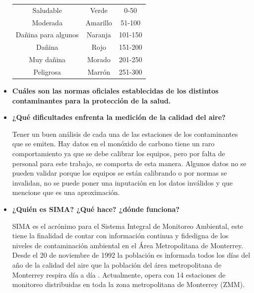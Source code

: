 \documentclass[10pt]{article}
\begin{document}
\begin{itemize}
            \begin{tabular}{c|c|c}
                 Saludable & Verde & 0-50  \\
                 Moderada & Amarillo & 51-100\\
                 Dañina para algunos & Naranja & 101-150\\
                 Dañina & Rojo & 151-200\\
                 Muy dañina & Morado & 201-250\\
                 Peligrosa & Marrón & 251-300
            \end{tabular}

        \item \textbf{Cuáles son las normas oficiales establecidas de los distintos contaminantes para la protección de la salud.}

        \item \textbf{¿Qué dificultades enfrenta la medición de la calidad del aire?}

        Tener un  buen análisis de cada una de las estaciones de los contaminantes que se emiten.
        Hay datos en el monóxido de carbono tiene un raro comportamiento ya que se debe calibrar los equipos, pero por falta de personal para este trabajo, se comporta de esta manera.
        Algunos datos no se pueden validar porque los equipos se están calibrando o por normas se invalidan, no se puede poner una inputación en los datos inválidos y que mencione que es una aproximación.

        \item \textbf{¿Quién es SIMA? ¿Qué hace? ¿dónde funciona?}

        SIMA es el acrónimo para el Sistema Integral de Monitoreo Ambiental, este tiene la finalidad de contar con información continua y fidedigna de los niveles de contaminación ambiental en el Área Metropolitana de Monterrey. Desde el 20 de noviembre de 1992 la población es informada todos los días del año de la calidad del aire que la población del área metropolitana de Monterrey respira día a día \cite{sima}. Actualmente, opera con 14 estaciones de monitoreo distribuidas en toda la zona metropolitana de Monterrey (ZMM).

    \end{itemize}

\end{document}
